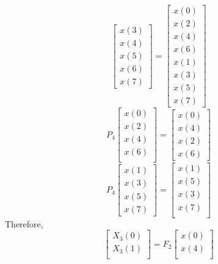 \documentclass[journal,12pt,twocolumn]{IEEEtran}
\renewcommand\thesection{\arabic{section}}
\begin{document}
\begin{enumerate}[label=\arabic*.,ref=\thesection.\theenumi]
\begin{equation}
\begin{bmatrix}
x(3) \\ 
x(4) \\ 
x(5) \\
x(6) \\
x(7)
\end{bmatrix}
 = 
\begin{bmatrix}
x(0) \\ 
x(2) \\ 
x(4) \\ 
x(6) \\
x(1) \\ 
x(3) \\ 
x(5) \\
x(7)
\end{bmatrix}
\end{equation}
\begin{equation}
P_{4}
\begin{bmatrix}
x(0) \\ 
x(2) \\ 
x(4) \\ 
x(6) \\
\end{bmatrix}
 = 
\begin{bmatrix}
x(0) \\ 
x(4) \\ 
x(2) \\
x(6)
\end{bmatrix}
\end{equation}
\begin{equation}
P_{4}
\begin{bmatrix}
x(1) \\ 
x(3) \\ 
x(5) \\
x(7)
\end{bmatrix}
 = 
\begin{bmatrix}
x(1) \\ 
x(5) \\ 
x(3) \\ 
x(7) \\
\end{bmatrix}
\end{equation}
Therefore,
\begin{equation}
\begin{bmatrix}
X_{3}(0) \\ 
X_{3}(1)\\ 
\end{bmatrix}
= F_{2}
\begin{bmatrix}
x(0) \\ 
x(4) \\ 
\end{bmatrix}

\end{equation}
\end{enumerate}
\end{document}
